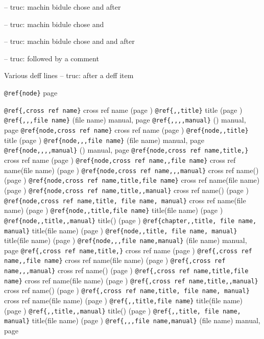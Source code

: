 \documentclass{book}
\begin{document}
\hbox{}-- truc: machin bidule chose and  after


\hbox{}-- truc: machin bidule chose and 


\hbox{}-- truc: machin bidule chose and and after


\hbox{}-- truc: followed by a comment


Various deff lines
\hbox{}-- truc: after a deff item



\texttt{@ref\{node\}} page \pageref{anchor:node}

\texttt{@ref\{,cross ref name\}} cross ref name (page \pageref{anchor:})
\texttt{@ref\{,,title\}} title (page \pageref{anchor:})
\texttt{@ref\{,,,file name\}} (file name) manual, page \pageref{anchor:}
\texttt{@ref\{,,,,manual\}} () manual, page \pageref{anchor:}
\texttt{@ref\{node,cross ref name\}} cross ref name (page \pageref{anchor:node})
\texttt{@ref\{node,,title\}} title (page \pageref{anchor:node})
\texttt{@ref\{node,,,file name\}} (file name) manual, page \pageref{anchor:node}
\texttt{@ref\{node,,,,manual\}} () manual, page \pageref{anchor:node}
\texttt{@ref\{node,cross ref name,title,\}} cross ref name (page \pageref{anchor:node})
\texttt{@ref\{node,cross ref name,,file name\}} cross ref name(file name) (page \pageref{anchor:node})
\texttt{@ref\{node,cross ref name,,,manual\}} cross ref name() (page \pageref{anchor:node})
\texttt{@ref\{node,cross ref name,title,file name\}} cross ref name(file name) (page \pageref{anchor:node})
\texttt{@ref\{node,cross ref name,title,,manual\}} cross ref name() (page \pageref{anchor:node})
\texttt{@ref\{node,cross ref name,title, file name, manual\}} cross ref name(file name) (page \pageref{anchor:node})
\texttt{@ref\{node,,title,file name\}} title(file name) (page \pageref{anchor:node})
\texttt{@ref\{node,,title,,manual\}} title() (page \pageref{anchor:node})
\texttt{@ref\{chapter,,title, file name, manual\}} title(file name) (page \pageref{anchor:chapter})
\texttt{@ref\{node,,title, file name, manual\}} title(file name) (page \pageref{anchor:node})
\texttt{@ref\{node,,,file name,manual\}} (file name) manual, page \pageref{anchor:node}
\texttt{@ref\{,cross ref name,title,\}} cross ref name (page \pageref{anchor:})
\texttt{@ref\{,cross ref name,,file name\}} cross ref name(file name) (page \pageref{anchor:})
\texttt{@ref\{,cross ref name,,,manual\}} cross ref name() (page \pageref{anchor:})
\texttt{@ref\{,cross ref name,title,file name\}} cross ref name(file name) (page \pageref{anchor:})
\texttt{@ref\{,cross ref name,title,,manual\}} cross ref name() (page \pageref{anchor:})
\texttt{@ref\{,cross ref name,title, file name, manual\}} cross ref name(file name) (page \pageref{anchor:})
\texttt{@ref\{,,title,file name\}} title(file name) (page \pageref{anchor:})
\texttt{@ref\{,,title,,manual\}} title() (page \pageref{anchor:})
\texttt{@ref\{,,title, file name, manual\}} title(file name) (page \pageref{anchor:})
\texttt{@ref\{,,,file name,manual\}} (file name) manual, page \pageref{anchor:}
\end{document}
